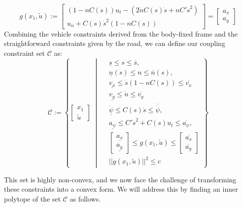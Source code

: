 \begin{equation}
	g(x_1, \tilde{u}) :=
	\begin{bmatrix}
		(1 - nC(s)) u_t - (2\dot{n}C(s)\dot{s} + nC' \dot{s}^2) \\
		u_n + C(s) \dot{s}^2 (1 - nC(s))
	\end{bmatrix}  = \begin{bmatrix}
		a_x \\
		a_y
	\end{bmatrix}
	\label{def:g}
\end{equation}
Combining the vehicle constraints derived from the body-fixed frame and the straightforward constraints given by the road, we can define our coupling constraint set $\mathcal{C}$ as:
\begin{equation}
	\mathcal{C} := \left\{
	\begin{bmatrix} x_1 \\ \tilde{u} \end{bmatrix} \; \middle|\;
	\begin{aligned}
		 & \underline{s} \leq s \leq \overline{s},                                     \\
		 & \underline{n}(s) \leq n \leq \overline{n}(s),                               \\
		 & \underline{v_x}  \leq  \dot{s}(1-nC(s))  \leq  \overline{v_x}               \\
		 & \underline{v_y} \leq \dot{n} \leq \overline{v_y}                            \\
		 & \underline{\dot{\psi}} \leq C(s) \dot{s} \leq \overline{\dot{\psi}},        \\
		 & \underline{a_{\psi}} \leq C' \dot{s}^2 + C(s) u_t \leq \overline{a_{\psi}}, \\
		 & \begin{bmatrix}
			   \underline{a_x} \\ \underline{a_y}
		   \end{bmatrix} \leq g(x_1, \tilde{u}) \leq \begin{bmatrix}
			                                             \overline{a_x} \\\overline{a_y}
		                                             \end{bmatrix}    \\
		 & ||g(x_1, \tilde{u})||^2 \leq c
	\end{aligned}
	\right\}
\end{equation}

This set is highly non-convex, and we now face the challenge of transforming these constraints into a convex form.
We will address this by finding an inner polytope of the set $\mathcal{C}$ as follows.

